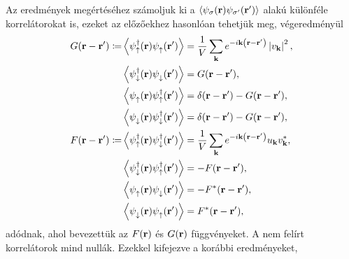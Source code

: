 \documentclass[a4paper,12pt,titlepage]{article}
\newcommand{\KK}{{\vb{k}}}
\newcommand{\RR}{{\vb{r}}}
\newcommand{\phantomdagger}{{\phantom{\dagger}}}
\begin{document}
Az eredmények megértéséhez számoljuk ki a $\left< \psi_\sigma(\RR) \psi_{\sigma^\prime}(\RR^\prime) \right>$ alakú különféle korrelátorokat is, ezeket az előzőekhez hasonlóan tehetjük meg, végeredményül
\begin{equation}
\begin{split}
	G(\RR - \RR^\prime) \coloneqq & \left< \psi_\uparrow^\dagger(\RR) \psi_\uparrow^\phantomdagger(\RR^\prime) \right> = \frac{1}{V} \sum\limits_\KK e^{-i \KK \left( \RR - \RR^\prime \right)} \left| v_\KK \right|^2, \\
	& \left< \psi_\downarrow^\dagger(\RR) \psi_\downarrow^\phantomdagger(\RR^\prime) \right> = G(\RR - \RR^\prime), \\
	& \left< \psi_\uparrow^\phantomdagger(\RR) \psi_\uparrow^\dagger(\RR^\prime) \right> = \delta(\RR - \RR^\prime) - G(\RR - \RR^\prime), \\
	& \left< \psi_\downarrow^\phantomdagger(\RR) \psi_\downarrow^\dagger(\RR^\prime) \right> = \delta(\RR - \RR^\prime) - G(\RR - \RR^\prime), \\
	F(\RR - \RR^\prime) \coloneqq & \left< \psi_\uparrow^\dagger(\RR) \psi_\downarrow^\dagger(\RR^\prime) \right> = \frac{1}{V} \sum\limits_\KK e^{-i \KK \left( \RR - \RR^\prime \right)} u_\KK v_\KK^*, \\
	& \left< \psi_\downarrow^\dagger(\RR) \psi_\uparrow^\dagger(\RR^\prime) \right> = -F(\RR - \RR^\prime), \\
	& \left< \psi_\uparrow^\phantomdagger(\RR) \psi_\downarrow^\phantomdagger(\RR^\prime) \right> = -F^*(\RR - \RR^\prime), \\
	& \left< \psi_\downarrow^\phantomdagger(\RR) \psi_\uparrow^\phantomdagger(\RR^\prime) \right> = F^*(\RR - \RR^\prime), \\
\end{split}
\end{equation}
adódnak, ahol bevezettük az $F(\RR)$ és $G(\RR)$ függvényeket.  A nem felírt korrelátorok mind nullák.  Ezekkel kifejezve a korábbi eredményeket,
\end{document}
